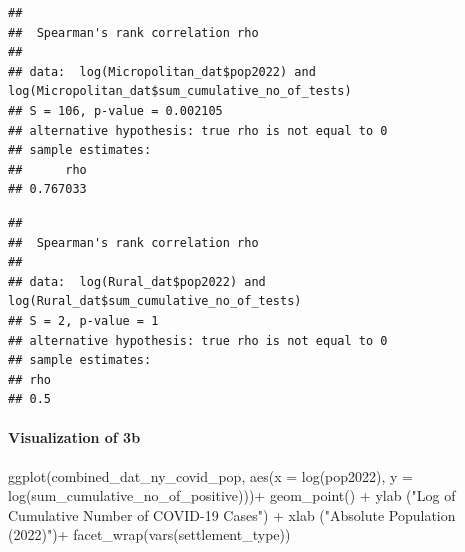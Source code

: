 \documentclass[
  12pt,
]{article}
\newenvironment{Shaded}{\begin{snugshade}}{\end{snugshade}}
\newcommand{\AttributeTok}[1]{\textcolor[rgb]{0.77,0.63,0.00}{#1}}
\newcommand{\DocumentationTok}[1]{\textcolor[rgb]{0.56,0.35,0.01}{\textbf{\textit{#1}}}}
\newcommand{\FunctionTok}[1]{\textcolor[rgb]{0.00,0.00,0.00}{#1}}
\newcommand{\NormalTok}[1]{#1}
\newcommand{\OtherTok}[1]{\textcolor[rgb]{0.56,0.35,0.01}{#1}}
\newcommand{\SpecialCharTok}[1]{\textcolor[rgb]{0.00,0.00,0.00}{#1}}
\newcommand{\StringTok}[1]{\textcolor[rgb]{0.31,0.60,0.02}{#1}}
\begin{document}
\begin{verbatim}
## 
##  Spearman's rank correlation rho
## 
## data:  log(Micropolitan_dat$pop2022) and log(Micropolitan_dat$sum_cumulative_no_of_tests)
## S = 106, p-value = 0.002105
## alternative hypothesis: true rho is not equal to 0
## sample estimates:
##      rho 
## 0.767033
\end{verbatim}

\begin{Shaded}
\end{Shaded}

\begin{verbatim}
## 
##  Spearman's rank correlation rho
## 
## data:  log(Rural_dat$pop2022) and log(Rural_dat$sum_cumulative_no_of_tests)
## S = 2, p-value = 1
## alternative hypothesis: true rho is not equal to 0
## sample estimates:
## rho 
## 0.5
\end{verbatim}

\hypertarget{visualization-of-3b}{%
\paragraph{Visualization of 3b}\label{visualization-of-3b}}

\begin{Shaded}
\begin{Highlighting}[]
\FunctionTok{ggplot}\NormalTok{(combined\_dat\_ny\_covid\_pop, }\FunctionTok{aes}\NormalTok{(}\AttributeTok{x =} \FunctionTok{log}\NormalTok{(pop2022), }\AttributeTok{y =} \FunctionTok{log}\NormalTok{(sum\_cumulative\_no\_of\_positive)))}\SpecialCharTok{+}
  \FunctionTok{geom\_point}\NormalTok{() }\SpecialCharTok{+} 
  \FunctionTok{ylab}\NormalTok{ (}\StringTok{"Log of Cumulative Number of COVID{-}19 Cases"}\NormalTok{) }\SpecialCharTok{+}
  \FunctionTok{xlab}\NormalTok{ (}\StringTok{"Absolute Population (2022)"}\NormalTok{)}\SpecialCharTok{+}
  \FunctionTok{facet\_wrap}\NormalTok{(}\FunctionTok{vars}\NormalTok{(settlement\_type)) }
\end{Highlighting}
\end{Shaded}
\end{document}
